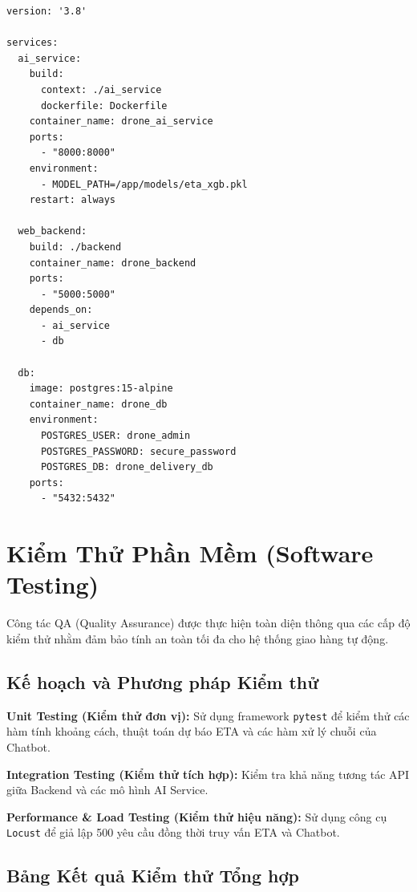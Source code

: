 \begin{verbatim}
version: '3.8'

services:
  ai_service:
    build:
      context: ./ai_service
      dockerfile: Dockerfile
    container_name: drone_ai_service
    ports:
      - "8000:8000"
    environment:
      - MODEL_PATH=/app/models/eta_xgb.pkl
    restart: always

  web_backend:
    build: ./backend
    container_name: drone_backend
    ports:
      - "5000:5000"
    depends_on:
      - ai_service
      - db

  db:
    image: postgres:15-alpine
    container_name: drone_db
    environment:
      POSTGRES_USER: drone_admin
      POSTGRES_PASSWORD: secure_password
      POSTGRES_DB: drone_delivery_db
    ports:
      - "5432:5432"
\end{verbatim}

\section{Kiểm Thử Phần Mềm (Software Testing)}

Công tác QA (Quality Assurance) được thực hiện toàn diện thông qua các cấp độ kiểm thử nhằm đảm bảo tính an toàn tối đa cho hệ thống giao hàng tự động.

\subsection{Kế hoạch và Phương pháp Kiểm thử}

\textbf{Unit Testing (Kiểm thử đơn vị):} Sử dụng framework \texttt{pytest} để kiểm thử các hàm tính khoảng cách, thuật toán dự báo ETA và các hàm xử lý chuỗi của Chatbot.

\textbf{Integration Testing (Kiểm thử tích hợp):} Kiểm tra khả năng tương tác API giữa Backend và các mô hình AI Service.

\textbf{Performance \& Load Testing (Kiểm thử hiệu năng):} Sử dụng công cụ \texttt{Locust} để giả lập 500 yêu cầu đồng thời truy vấn ETA và Chatbot.

\subsection{Bảng Kết quả Kiểm thử Tổng hợp}

